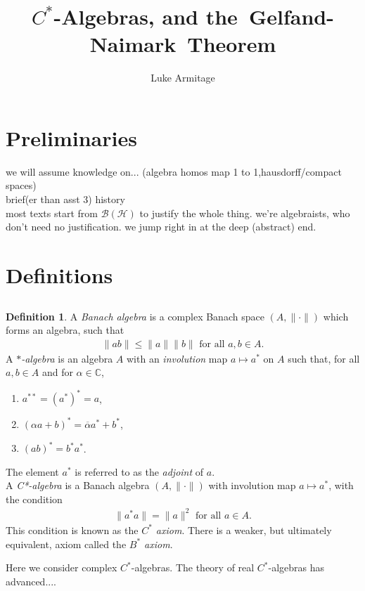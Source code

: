 \documentclass[12pt,a4paper]{amsart}
\author{Luke Armitage}
\title{$C^\ast$-Algebras, and the~Gelfand-Naimark~Theorem}
\theoremstyle{plain}
\theoremstyle{definition}
\newtheorem{defn}{Definition}
\renewcommand{\H}{\mathcal{H}}
\newcommand{\B}{\mathcal{B}}
\newcommand{\BH}{\mathcal{\B(\H)}}
\newcommand{\1}{\mathbbm{1}}
\newcommand{\C}{\mathbb{C}}
\begin{document}
\maketitle
\makeatletter  %
    \providecommand\@dotsep{5}
  \makeatother
\listoftodos\relax
\newcommand\Item[1][]{ %
  \ifx\relax#1\relax  \item \else \item[#1] \fi
  \abovedisplayskip=0pt\abovedisplayshortskip=0pt~\vspace*{-\baselineskip}}

\section{Preliminaries}
we will assume knowledge on... (algebra homos map 1 to 1,hausdorff/compact spaces)\\
brief(er than asst 3) history \\
most texts start from $\BH$ to justify the whole thing. we're algebraists, who don't need no justification. we jump right in at the deep (abstract) end.


\section{Definitions}

\subsection*{}
\begin{defn}
	A \emph{Banach algebra} is a complex Banach space $(A,\|\cdot\|)$ which forms an 
	algebra, such that 
	\begin{align*}
		\|ab\| \leq \|a\| \|b\| \mbox{ for all } a,b \in A.
	\end{align*}
	A \emph{$\ast$-algebra} is an algebra $A$ with an \emph{involution} map 
	$a \mapsto a^\ast$ on $A$ such that, for all $a,b \in A$ and for $\alpha \in \C$,
	\renewcommand{\labelenumi}{(\roman{enumi})}
	\begin{enumerate}
		\item $a^{\ast\ast} = (a^\ast)^\ast = a$,
		\item $(\alpha a+b)^\ast = \overline{\alpha} a^\ast + b^\ast$,
		\item $(ab)^\ast = b^\ast a^\ast$.
	\end{enumerate}
	The element $a^\ast$ is referred to as the \emph{adjoint} of $a$. 		\\
	A \emph{C*-algebra} is a Banach algebra $(A, \| \cdot \|)$ with involution 
	map $a \mapsto a^\ast$, with the condition
	\begin{align*}
		\|a ^\ast a\| = \|a\|^2 \mbox{ for all } a \in A.
	\end{align*}
	This condition is known as the \emph{$C^\ast$ axiom}. There is a weaker, but 
	ultimately equivalent, axiom called the \emph{$B^\ast$ axiom}. %
\end{defn}
Here we consider complex $C^\ast$-algebras. The theory of real $C^\ast$-algebras has advanced....
\end{document}
